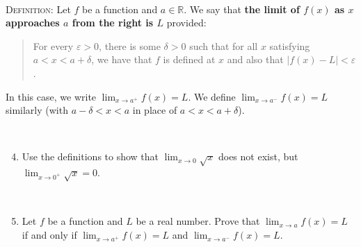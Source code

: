 \documentclass[12pt]{amsart}
\newcommand{\R}{\mathbb{R}}
\newcommand{\e}{\varepsilon}
\newcommand{\ds}{\displaystyle}
\begin{document}
\

\noindent \textsc{Definition:} Let $f$ be a function and $a\in \R$. We say that \textbf{the limit of $f(x)$ as $x$ approaches $a$ from the right is $L$} provided:
\begin{quote} For every $\e>0$, there is some $\delta>0$ such that for all $x$ satisfying $a<x<a+\delta$, we have that $f$ is defined at $x$ and also that $|f(x) - L| < \e$.
\end{quote}
In this case, we write $\displaystyle \lim_{x\to a^+} f(x) = L$.
We define $\displaystyle \lim_{x\to a^-} f(x) = L$ similarly (with $a-\delta<x<a$ in place of $a<x<a+\delta$).

\

\begin{enumerate} \setcounter{enumi}{3}
\item Use the definitions to show that $\ds\lim_{x\to 0} \sqrt{x}$ does not exist, but $\ds\lim_{x\to 0^+} \sqrt{x} = 0$.

\

\item Let $f$ be a function and $L$ be a real number. Prove that $\ds\lim_{x\to a} f(x) = L$ if and only if $\ds \lim_{x\to a^+} f(x) = L$ and  $\lim_{x\to a^-} f(x)=L$.
\end{enumerate}
\end{document}

